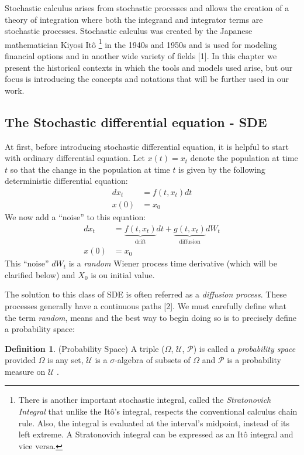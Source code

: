\documentclass[12pt,twoside]{reedthesis}
\theoremstyle{definition}
\newtheorem{definition}{Definition}[section]
\theoremstyle{definition}
\theoremstyle{remark}
\begin{document}
  Stochastic calculus arises from stochastic processes and allows the
  creation of a theory of integration where both the integrand and
  integrator terms are stochastic processes. Stochastic calculus was
  created by the Japanese mathematician Kiyosi Itô
  \footnote{There is another important stochastic integral, called the \textit{Stratonovich Integral} that unlike the Itô's integral, respects the conventional calculus chain rule. Also, the integral is evaluated at the interval's midpoint, instead of its left extreme. A Stratonovich integral can be expressed as an Itô integral and vice versa.}
  in the 1940s and 1950s and is used for modeling financial options and in
  another wide variety of fields {[}1{]}. In this chapter we present the
  historical contexts in which the tools and models used arise, but our
  focus is introducing the concepts and notations that will be further
  used in our work.
  
  \subsection{The Stochastic differential equation -
  SDE}\label{the-stochastic-differential-equation---sde}
  
  At first, before introducing stochastic differential equation, it is
  helpful to start with ordinary differential equation. Let \(x(t) = x_t\)
  denote the population at time \(t\) so that the change in the population
  at time \(t\) is given by the following deterministic differential
  equation:
  \begin{align}
  dx_t &= f(t, x_t)dt \\
  x(0) &= x_0 \nonumber
  \end{align}
  We now add a ``noise'' to this equation:
  \begin{align} \label{sde1}
  dx_t &= \underbrace{f(t, x_t)}_\text{drift}dt + \underbrace{g(t, x_t)}_\text{diffusion}dW_t \\
  x(0) &= x_0 \nonumber
  \end{align}
  This ``noise'' \(dW_t\) is a \emph{random} Wiener process time
  derivative (which will be clarified below) and \(X_0\) is ou initial
  value.
  
  The solution to this class of SDE is often referred as a \emph{diffusion
  process}. These processes generally have a continuous paths {[}2{]}. We
  must carefully define what the term \emph{random}, means and the best
  way to begin doing so is to precisely define a probability space:
  \begin{definition}{(Probability Space)} A triple ($\Omega$, $\mathcal {U}$, $\mathcal {P}$) is called a \textit{probability space} provided $\Omega$ is any set, $\mathcal {U}$ is a $\sigma$-algebra of subsets of $\Omega$ and $\mathcal {P}$ is a probability measure on $\mathcal {U}$ .
  \end{definition}
\end{document}
